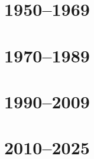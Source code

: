 \documentclass[
    10pt,
    a5paper,
    twoside,
    openright
]{memoir}
\begin{document}



\frontmatter






\tableofcontents*


\mainmatter

\part{1950--1969}





\part{1970--1989}





\part{1990--2009}





\part{2010--2025}






\backmatter

\printbibliography[title={Fontes e referências}]
\end{document}
